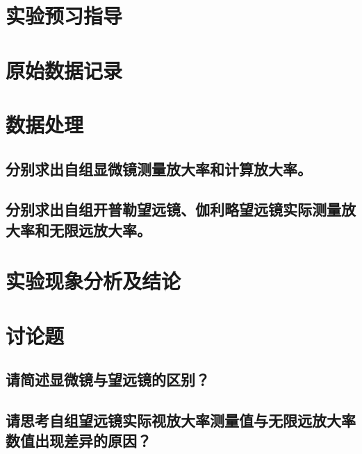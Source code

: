 \documentclass[signature=data]{physicsreport}
\begin{document}
\maketitle

\section{实验预习指导}
\newpage

\section{原始数据记录}
\makeatletter
{}
\makeatother

\newpage

\section{数据处理}
\subsection{分别求出自组显微镜测量放大率和计算放大率。}


\subsection{分别求出自组开普勒望远镜、伽利略望远镜实际测量放大率和无限远放大率。}

\newpage

\section{实验现象分析及结论}

\section{讨论题}

\subsection{请简述显微镜与望远镜的区别？}

\subsection{请思考自组望远镜实际视放大率测量值与无限远放大率数值出现差异的原因？}
\end{document}
